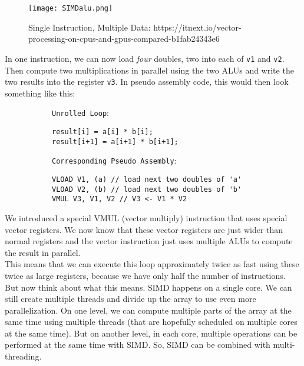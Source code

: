 \documentclass[main.tex]{subfiles}
\begin{document}
\begin{figure}[H]
    \centering
    \texttt{[image: SIMDalu.png]}
    \caption{Single Instruction, Multiple Data: https://itnext.io/vector-processing-on-cpus-and-gpus-compared-b1fab24343e6}
\end{figure}
\noindent In one instruction, we can now load \textit{four} doubles, two into each of \texttt{v1} and \texttt{v2}. Then compute two multiplications in parallel using the two ALUs and write the two results into the register \texttt{v3}. In pseudo assembly code, this would then look something like this:
\begin{figure}[H]
    \begin{subfigure}[t]{.5\textwidth}
        \texttt{Unrolled Loop}:
        \begin{verbatim}
result[i] = a[i] * b[i];
result[i+1] = a[i+1] * b[i+1];
        \end{verbatim}
    \end{subfigure}%
    \begin{subfigure}[t]{.6\textwidth}
        \texttt{Corresponding Pseudo Assembly}:
        \begin{verbatim}
VLOAD V1, (a) // load next two doubles of 'a'
VLOAD V2, (b) // load next two doubles of 'b'
VMUL V3, V1, V2 // V3 <- V1 * V2
        \end{verbatim}
    \end{subfigure}
\end{figure}
\noindent We introduced a special VMUL (vector multiply) instruction that uses special vector registers. We now know that these vector registers are just wider than normal registers and the vector instruction just uses multiple ALUs to compute the result in parallel.\\[3mm] This means that we can execute this loop approximately twice as fast using these twice as large registers, because we have only half the number of instructions.\\
But now think about what this means. SIMD happens on a single core. We can still create multiple threads and divide up the array to use even more parallelization. On one level, we can compute multiple parts of the array at the same time using multiple threads (that are hopefully scheduled on multiple cores at the same time). But on another level, in each core, multiple operations can be performed at the same time with SIMD. So, SIMD can be combined with multi-threading.
\end{document}
